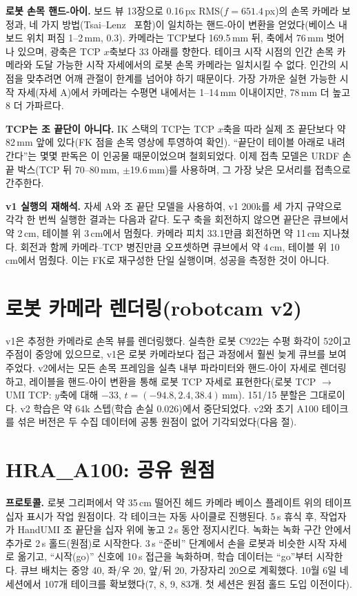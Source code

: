 \documentclass[conference,10pt]{IEEEtran}
\newcommand{\mm}{\,mm\xspace}
\begin{document}
\textbf{로봇 손목 핸드-아이.} 보드 뷰 13장으로 0.16\,px RMS($f=651.4$\,px)의 손목 카메라 보정과, 네 가지 방법(Tsai--Lenz~\cite{tsai1989handeye}
포함)이 일치하는 핸드-아이 변환을 얻었다(베이스 내 보드 위치 퍼짐 1--2\mm, 0.3\textdegree). 카메라는 TCP보다 169.5\mm
뒤, 축에서 76\mm 벗어나 있으며, 광축은 TCP $x$축보다 33\textdegree{} 아래를 향한다. 테이크 시작 시점의 인간 손목 카메라와
도달 가능한 시작 자세에서의 로봇 손목 카메라는 일치시킬 수 없다. 인간의 시점을 맞추려면 어깨 관절이 한계를 넘어야 하기
때문이다. 가장 가까운 실현 가능한 시작 자세(자세 A)에서 카메라는 수평면 내에서는 1--14\mm 이내이지만, 78\mm 더 높고
8\textdegree{} 더 가파르다.

\textbf{TCP는 조 끝단이 아니다.} IK 스택의 TCP는 TCP $x$축을 따라 실제 조 끝단보다 약 82\mm 앞에 있다(FK 점을 손목
영상에 투영하여 확인). ``끝단이 테이블 아래로 내려간다''는 몇몇 판독은 이 인공물 때문이었으며 철회되었다. 이제 접촉 모델은
URDF 손끝 박스(TCP 뒤 70--80\mm, $\pm$19.6\mm)를 사용하며, 그 가장 낮은 모서리를 접촉으로 간주한다.

\textbf{v1 실행의 재해석.} 자세 A와 조 끝단 모델을 사용하여, v1 200k를 세 가지 규약으로 각각 한 번씩 실행한 결과는
다음과 같다. 도구 축을 회전하지 않으면 끝단은 큐브에서 약 2\,cm, 테이블 위 3\,cm에서 멈췄다. 카메라 피치 33.1\textdegree{}만큼
회전하면 약 11\,cm 지나쳤다. 회전과 함께 카메라--TCP 병진만큼 오프셋하면 큐브에서 약 4\,cm, 테이블 위 10\,cm에서 멈췄다.
이는 FK로 재구성한 단일 실행이며, 성공을 측정한 것이 아니다.

\section{로봇 카메라 렌더링(robotcam v2)}\label{p2:sec:v2}
v1은 추정한 카메라로 손목 뷰를 렌더링했다. 실측한 로봇 C922는 수평 화각이 52\textdegree{}이고 주점이 중앙에 있으므로, v1은
로봇 카메라보다 접근 과정에서 훨씬 늦게 큐브를 보여 주었다. v2에서는 모든 손목 프레임을 실측 내부 파라미터와 핸드-아이
자세로 렌더링하고, 레이블을 핸드-아이 변환을 통해 로봇 TCP 자세로 표현한다(로봇 TCP $\to$ UMI TCP: $y$축에 대해
$-33$\textdegree, $t=(-94.8, 2.4, 38.4)$\mm). 151/15 분할은 그대로이다. v2 학습은 약 64k 스텝(학습 손실 0.026)에서
중단되었다. v2와 초기 A100 테이크를 섞은 버전은 두 수집 데이터에 공통 원점이 없어 기각되었다(다음 절).

\section{HRA\_A100: 공유 원점}\label{p2:sec:a100}
\textbf{프로토콜.} 로봇 그리퍼에서 약 35\,cm 떨어진 헤드 카메라 베이스 플레이트 위의 테이프 십자 표시가 작업 원점이다.
각 테이크는 자동 사이클로 진행된다. 5\,s 휴식 후, 작업자가 HandUMI 조 끝단을 십자 위에 놓고 2\,s 동안 정지시킨다. 녹화는
녹화 구간 안에서 추가로 2\,s 홀드(원점)로 시작한다. 3\,s ``준비'' 단계에서 손을 로봇과 비슷한 시작 자세로 옮기고,
``시작(go)'' 신호에 10\,s 접근을 녹화하며, 학습 데이터는 ``go''부터 시작한다. 큐브 배치는 중앙 40, 좌/우 20, 앞/뒤 20,
가장자리 20으로 계획했다. 10월 6일 네 세션에서 107개 테이크를 확보했다(7, 8, 9, 83개. 첫 세션은 원점 홀드 도입 이전이다).
\end{document}
